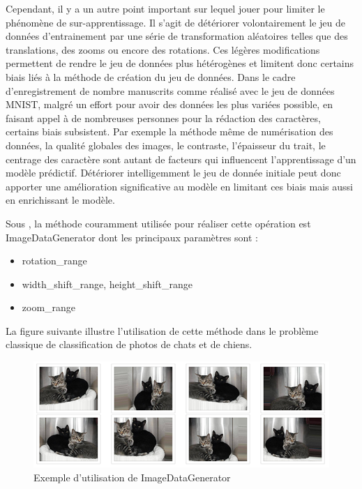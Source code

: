 Cependant, il y a un autre point important sur lequel jouer pour limiter le phénomène de
sur-apprentissage. Il s'agit de détériorer volontairement le jeu de données d'entrainement
par une série de transformation aléatoires telles que des translations, des zooms ou
encore des rotations. Ces légères modifications permettent de rendre le jeu de données 
plus hétérogènes et limitent donc certains biais liés à la méthode de création du jeu de
données. Dans le cadre d'enregistrement de nombre manuscrits comme réalisé avec le jeu de 
données MNIST, malgré un effort pour avoir des données les plus variées possible, en faisant
appel à de nombreuses personnes pour la rédaction des caractères, certains biais subsistent.
Par exemple la méthode même de numérisation des données, la qualité globales des images,
le contraste, l'épaisseur du trait, le centrage des caractère sont autant de facteurs qui 
influencent l'apprentissage d'un modèle prédictif. Détériorer intelligemment le jeu de
donnée initiale peut donc apporter une amélioration significative au modèle en limitant 
ces biais mais aussi en enrichissant le modèle. 

Sous \Python {}, la méthode couramment utilisée pour réaliser cette opération
est ImageDataGenerator dont les principaux paramètres sont :

\begin{itemize}
\item rotation_range 
\item width_shift_range, height_shift_range
\item zoom_range
\end{itemize}

La figure suivante illustre l'utilisation
de cette méthode dans le problème classique de classification de photos de chats et de
chiens. 

\begin{figure}[h]
  \centering
  \includegraphics[scale=0.9]{assets/augmented-image}
  \caption{Exemple d'utilisation de ImageDataGenerator}
  \label{fig:augmented-image}
\end{figure}


